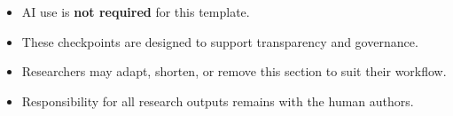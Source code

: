 \documentclass[
]{report}
\providecommand{\tightlist}{%
  \setlength{\itemsep}{0pt}\setlength{\parskip}{0pt}}
\begin{document}
\begin{itemize}
\tightlist
\item
  AI use is \textbf{not required} for this template.
\item
  These checkpoints are designed to support transparency and governance.
\item
  Researchers may adapt, shorten, or remove this section to suit their
  workflow.
\item
  Responsibility for all research outputs remains with the human
  authors.
\end{itemize}
\end{document}
